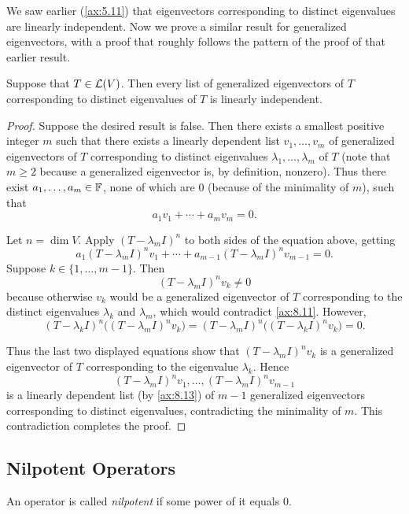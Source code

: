 We saw earlier (\ref{ax:5.11}) that eigenvectors corresponding to distinct
eigenvalues are linearly independent. Now we prove a similar result for
generalized eigenvectors, with a proof that roughly follows the pattern of the
proof of that earlier result.

\begin{result}\label{ax:8.12}
Suppose that $T\in\mathcal{L}(V)$. Then every list of generalized eigenvectors of $T$
corresponding to distinct eigenvalues of $T$ is linearly independent.
\end{result}

\begin{proof}
Suppose the desired result is false. Then there exists a smallest positive
integer $m$ such that there exists a linearly dependent list
$v_1,\dots,v_m$ of generalized eigenvectors of $T$ corresponding to distinct
eigenvalues $\lambda_1,\dots,\lambda_m$ of $T$ (note that $m\ge2$ because a
generalized eigenvector is, by definition, nonzero). Thus there exist
$a_1,\dots,a_m\in\mathbb{F}$, none of which are $0$ (because of the minimality of $m$),
such that
\[ a_1v_1+\cdots+a_mv_m = 0. \]

Let $n=\dim V$. Apply $(T-\lambda_mI)^n$ to both sides of the equation above,
getting%
\[ a_1(T-\lambda_mI)^nv_1+\cdots+a_{m-1}(T-\lambda_mI)^nv_{m-1} = 0.
   \tag*{\thetheorem} \]
Suppose $k\in\{1,\dots,m-1\}$. Then
\[ (T-\lambda_mI)^nv_k \ne 0 \]
because otherwise $v_k$ would be a generalized eigenvector of $T$ corresponding
to the distinct eigenvalues $\lambda_k$ and $\lambda_m$, which would contradict
\ref{ax:8.11}. However,
\[ (T-\lambda_kI)^n\bigl((T-\lambda_mI)^nv_k\bigr)
   = (T-\lambda_mI)^n\bigl((T-\lambda_kI)^nv_k\bigr) = 0. \]

Thus the last two displayed equations show that $(T-\lambda_mI)^nv_k$ is a
generalized eigenvector of $T$ corresponding to the eigenvalue $\lambda_k$.
Hence
\[ (T-\lambda_mI)^nv_1,\dots,(T-\lambda_mI)^nv_{m-1} \]
is a linearly dependent list (by \ref{ax:8.13}) of $m-1$ generalized
eigenvectors corresponding to distinct eigenvalues, contradicting the
minimality of $m$. This contradiction completes the proof.
\end{proof}

\subsection{Nilpotent Operators}

\begin{definition}[Nilpotent]\label{ax:8.14}
An operator is called \emph{nilpotent} if some power of it equals $0$.
\end{definition}

